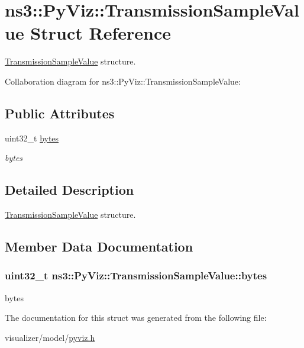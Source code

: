 \hypertarget{structns3_1_1PyViz_1_1TransmissionSampleValue}{}\section{ns3\+:\+:Py\+Viz\+:\+:Transmission\+Sample\+Value Struct Reference}
\label{structns3_1_1PyViz_1_1TransmissionSampleValue}


\hyperlink{structns3_1_1PyViz_1_1TransmissionSampleValue}{Transmission\+Sample\+Value} structure.  




Collaboration diagram for ns3\+:\+:Py\+Viz\+:\+:Transmission\+Sample\+Value\+:
\subsection*{Public Attributes}
\begin{DoxyCompactItemize}
\item 
uint32\+\_\+t \hyperlink{structns3_1_1PyViz_1_1TransmissionSampleValue_a9528dcaab2a668f5524270313aeaf125}{bytes}
\begin{DoxyCompactList}\small\item\em bytes \end{DoxyCompactList}\end{DoxyCompactItemize}


\subsection{Detailed Description}
\hyperlink{structns3_1_1PyViz_1_1TransmissionSampleValue}{Transmission\+Sample\+Value} structure. 

\subsection{Member Data Documentation}
\subsubsection[{\texorpdfstring{bytes}{bytes}}]{\setlength{\rightskip}{0pt plus 5cm}uint32\+\_\+t ns3\+::\+Py\+Viz\+::\+Transmission\+Sample\+Value\+::bytes}\hypertarget{structns3_1_1PyViz_1_1TransmissionSampleValue_a9528dcaab2a668f5524270313aeaf125}{}\label{structns3_1_1PyViz_1_1TransmissionSampleValue_a9528dcaab2a668f5524270313aeaf125}


bytes 



The documentation for this struct was generated from the following file\+:\begin{DoxyCompactItemize}
\item 
visualizer/model/\hyperlink{pyviz_8h}{pyviz.\+h}\end{DoxyCompactItemize}
